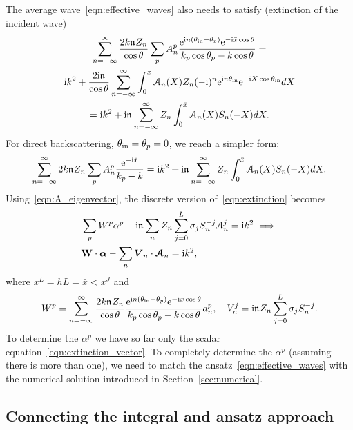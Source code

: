 \documentclass[12pt, a4paper]{article}
\begin{document}
 The average wave~\eqref{eqn:effective_waves} also needs to satisfy (extinction of the incident wave)
 \begin{multline}
 \sum_{n=-\infty}^\infty \frac{2 k \mathfrak n_{} Z_n}{\cos \theta}  \sum_{p}
  A_n^p  \frac{\textrm{e}^{\textrm{i} n (\theta_{\mathrm{in}} - \theta_p)} \textrm{e}^{ - \textrm{i} \bar x  \cos \theta}}{k_p \cos \theta_p - k \cos \theta}
   = \\
 \textrm{i} k^2 +  \frac{2\textrm{i} \mathfrak n_{}}{\cos \theta} \sum_{n=-\infty}^\infty \int_{0}^{{\bar x}}
     \mathcal A_n(X) Z_n (-\textrm{i})^{n} \textrm{e}^{\textrm{i} n \theta_{\mathrm{in}}} \textrm{e}^{-\textrm{i} X \cos \theta_{\mathrm{in}}}  d X
     \\
   = \textrm{i} k^2 +
   \textrm{i} \mathfrak n_{} \sum_{n=-\infty}^\infty Z_n \int_{0}^{{\bar x}}
     \mathcal A_n(X) S_n(-X) d X.
     \label{eqn:extinction}
 \end{multline}
 For direct backscattering, $\theta_{\mathrm{in}} = \theta_p =0$, we reach a simpler form:
 \begin{equation}
 \sum_{n=-\infty}^\infty 2 k \mathfrak n_{} Z_n  \sum_{p}
  A_n^p  \frac{\textrm{e}^{- \textrm{i} \bar x}}{k_p  - k }
   = \textrm{i} k^2 +
   \textrm{i} \mathfrak n_{} \sum_{n=-\infty}^\infty Z_n \int_{0}^{{\bar x}}
     \mathcal A_n(X) S_n(-X) d X.
 \end{equation}
 Using~\eqref{eqn:A_eigenvector}, the discrete version of~\eqref{eqn:extinction} becomes
 \begin{align}
   &   \sum_p   W^p  \alpha^p - \textrm{i} \mathfrak n_{} \sum_n Z_n \sum_{j=0}^L \sigma_j S^{-j}_n \mathcal A_n^j  =
   \textrm{i} k^2 \implies   \\ &
    \mathbf W \cdot \boldsymbol{\alpha} - \sum_n \boldsymbol{V}_n \cdot \boldsymbol{\mathcal A}_n =
    \textrm{i} k^2,
    \label{eqn:extinction_vector}
 \end{align}
 where $x^L = h L = \bar x < x^J$ and
 \begin{equation}
   W^p  = \sum_{n=-\infty}^\infty \frac{2 k \mathfrak n_{} Z_n}{\cos \theta}
     \frac{\textrm{e}^{\textrm{i} n (\theta_{\mathrm{in}} - \theta_p)} \textrm{e}^{- \textrm{i} \bar x  \cos \theta}}{k_p \cos \theta_p - k \cos \theta} a_n^p,  \quad
    V_n^j =  \textrm{i} \mathfrak n_{} Z_n \sum_{j=0}^L \sigma_j S^{-j}_n.
    \label{eqn:extinction_matrix}
 \end{equation}
To determine the $\alpha^p$ we have so far only the scalar equation~\eqref{eqn:extinction_vector}. To completely determine the $\alpha^p$ (assuming there is more than one), we need to match the ansatz~\eqref{eqn:effective_waves} with the numerical solution introduced in Section~\ref{sec:numerical}.


\subsection{Connecting the integral and ansatz approach}
\end{document}
